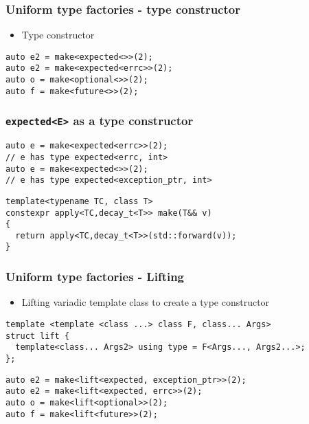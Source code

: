 \documentclass[xcolor=dvipsnames]{beamer}
\newcommand{\cpp}[1]{\lstinline{#1}}
\begin{document}
\begin{frame}[fragile]
\frametitle{Uniform type factories - type constructor}

\begin{itemize}
  \item Type constructor 
\end{itemize}

\begin{lstlisting}
auto e2 = make<expected<>>(2); 
auto e2 = make<expected<errc>>(2);
auto o = make<optional<>>(2); 
auto f = make<future<>>(2); 
\end{lstlisting}
\end{frame}
\begin{frame}[fragile]
\frametitle{\cpp{expected<E>} as a type constructor}

\begin{lstlisting}
auto e = make<expected<errc>>(2); 
// e has type expected<errc, int>
auto e = make<expected<>>(2); 
// e has type expected<exception_ptr, int>
\end{lstlisting}

\begin{lstlisting}
template<typename TC, class T>
constexpr apply<TC,decay_t<T>> make(T&& v)  
{
  return apply<TC,decay_t<T>>(std::forward(v));
}
\end{lstlisting}

\end{frame}
\begin{frame}[fragile]
\frametitle{Uniform type factories - Lifting }

\begin{itemize}
  \item Lifting variadic template class to create a type constructor 
\end{itemize}

\begin{lstlisting}
template <template <class ...> class F, class... Args>
struct lift {
  template<class... Args2> using type = F<Args..., Args2...>;
};
\end{lstlisting} 

\begin{lstlisting}
auto e2 = make<lift<expected, exception_ptr>>(2); 
auto e2 = make<lift<expected, errc>>(2);
auto o = make<lift<optional>>(2); 
auto f = make<lift<future>>(2); 
\end{lstlisting}

\end{frame}
\end{document}

